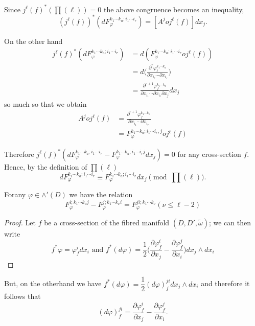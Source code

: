 Since  $j^\ell (f)^* (\prod (\ell)) = 0$ the above congruence becomes
an inequality,  
$$
(j^{\ell}(f))^* \left(dF^{k_ 1\cdots k_a ; i_1 \cdots i_r }_{\varphi}\right) =
[A^j o j^\ell (f)] dx_j. 
$$

\noindent
On the other hand
\begin{align*}
  j^\ell(f)^* (dF_\varphi^{k_ 1\cdots k_a ; i_1 \cdots i_r }) & =
  d(F^{k_ 1\cdots k_a ; i_1 \cdots i_r }_{\varphi} o j^\ell(f)) \\ 
  & = d \bigg( \frac{\partial^r \varphi_\ell^{k_1 \cdots k_a}}{\partial x_{i_\ell}
    \cdots \partial x_{i_r}} \bigg) \\ 
  & = \frac{\partial^{r+1} \varphi^{k_1 \cdots k_a}_f}{\partial
    x_{i_1} \cdots \partial x_{i_r} \partial x_j} dx_j 
\end{align*}
so much so that we obtain
\begin{align*}
  A^j o j^\ell (f) & = \frac{\partial^{r+1} \varphi^{k_1 \cdots
      k_a}_f}{\partial x_{i_1} \cdots \partial x_{i_r}} \\ 
  &= F^{k_ 1\cdots k_a ; i_1 \cdots i_r,  j}_{\varphi} o j^\ell (f)
\end{align*}

Therefore $j^\ell(f)^* (dF^{k_ 1\cdots k_a ; i_1 \cdots i_r
}_{\varphi} - F^{k_ 1\cdots k_a ; i_1 \cdots i_r j }_{\varphi} dx_j) =
0$ for any cross-section $f$. Hence, by the definition of
$\prod(\ell)$ 
$$
dF^{k_ 1\cdots k_a ; i_1 \cdots i_r }_{\varphi}  \equiv F^{k_ 1\cdots
  k_a ; i_1 \cdots i_r }_{\varphi} dx_j \pmod{ \prod (\ell)}. 
$$

\begin{proposition}\label{chap3:sec3.3:prop4}%
  For\pageoriginale any $\varphi \in \wedge' (D)$ we have the relation 
  $$
  F^{i ;k_ 1\cdots k_\nu j }_{\varphi} - F^{j ;k_ 1\cdots k_\nu i
  }_{\varphi} = F^{ji ;k_ 1\cdots k_\nu  }_{\varphi} (\nu \leq \ell -
  2) 
  $$
\end{proposition}

\begin{proof}
  Let $f$ be a cross-section of the fibred manifold $(D, D',
  \tilde{\omega})$; we can then write 
  $$
  f^* \varphi = \varphi^i_f dx_i \text{ and } f^* (d \varphi) =
  \frac{1}{2} \bigg( \frac{\partial \varphi^i_f} {\partial x_j} -
  \frac{ \partial \varphi^j_f} {\partial x_i}\bigg) dx_j \wedge dx_i 
  $$
\end{proof}

But, on the otherhand we have $f^* (d \varphi) = \dfrac{1}{2} (d
\varphi)_f^{j i} dx_j \wedge dx_i$ and therefore it follows that 
$$
(d \varphi)^{ji}_{f} =\frac{\partial \varphi^i_f} {\partial x_j}-
\frac{\partial \varphi^j_f} {\partial x_i}.  
$$

